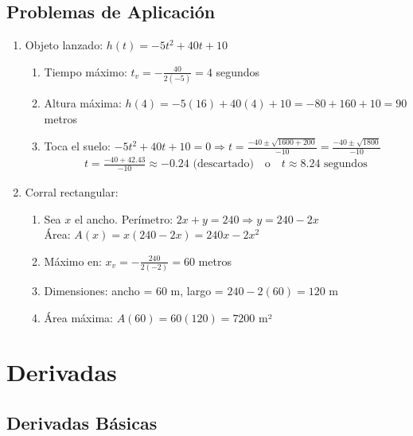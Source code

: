 \documentclass[12pt,a4paper]{article}
\begin{document}
\subsection{Problemas de Aplicación}

\begin{enumerate}
    \item Objeto lanzado: $h(t) = -5t^2 + 40t + 10$
    \begin{enumerate}
        \item Tiempo máximo: $t_v = -\frac{40}{2(-5)} = 4$ segundos
        \item Altura máxima: $h(4) = -5(16) + 40(4) + 10 = -80 + 160 + 10 = 90$ metros
        \item Toca el suelo: $-5t^2 + 40t + 10 = 0 \Rightarrow t = \frac{-40 \pm \sqrt{1600 + 200}}{-10} = \frac{-40 \pm \sqrt{1800}}{-10}$
        \begin{align*}
            t = \frac{-40 + 42.43}{-10} \approx -0.24 \text{ (descartado)} \quad \text{o} \quad t \approx 8.24 \text{ segundos}
        \end{align*}
    \end{enumerate}
    
    \item Corral rectangular:
    \begin{enumerate}
        \item Sea $x$ el ancho. Perímetro: $2x + y = 240 \Rightarrow y = 240 - 2x$\\
        Área: $A(x) = x(240 - 2x) = 240x - 2x^2$
        \item Máximo en: $x_v = -\frac{240}{2(-2)} = 60$ metros
        \item Dimensiones: ancho = 60 m, largo = $240 - 2(60) = 120$ m
        \item Área máxima: $A(60) = 60(120) = 7200$ m²
    \end{enumerate}
\end{enumerate}

\section{Derivadas}

\subsection{Derivadas Básicas}
\end{document}
